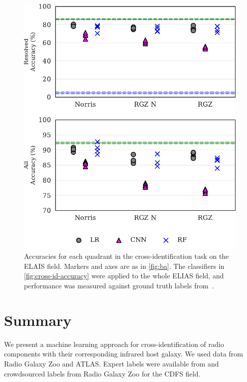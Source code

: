 \documentclass[fleqn,usenatbib,usedcolumn]{mnras}
\begin{document}
\begin{figure}
  \centering
  \includegraphics[width=\columnwidth]{images/elais_cross_identification_grid.pdf}
  \caption{Accuracies for each quadrant in the cross-identification
    task on the ELAIS field. Markers and axes are as in \autoref{fig:ba}.
    The classifiers in \autoref{fig:cross-id-accuracy}
    were applied to the whole ELIAS field, and performance was measured against
    ground truth labels from~\citet{middelberg08}.
    \label{fig:elais-cross-id-accuracy}}
\end{figure}


\section{Summary}

We present a machine learning approach for cross-identification of radio components with their corresponding infrared host galaxy. We used data from Radio Galaxy Zoo and ATLAS.  Expert labels were available from \citet{norris06} and crowdsourced labels from Radio Galaxy Zoo for the CDFS field.


%


\end{document}
